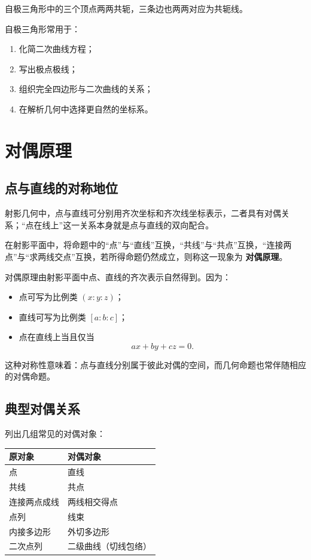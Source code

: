 \begin{property}
自极三角形中的三个顶点两两共轭，三条边也两两对应为共轭线。
\end{property}

自极三角形常用于：

\begin{enumerate}
    \item 化简二次曲线方程；
    \item 写出极点极线；
    \item 组织完全四边形与二次曲线的关系；
    \item 在解析几何中选择更自然的坐标系。
\end{enumerate}

\chapter{对偶原理}

\section{点与直线的对称地位}
射影几何中，点与直线可分别用齐次坐标和齐次线坐标表示，二者具有对偶关系；“点在线上”这一关系本身就是点与直线的双向配合。

\begin{definition}
在射影平面中，将命题中的“点”与“直线”互换，“共线”与“共点”互换，“连接两点”与“求两线交点”互换，若所得命题仍然成立，则称这一现象为 \textbf{对偶原理}。
\end{definition}

对偶原理由射影平面中点、直线的齐次表示自然得到。因为：

\begin{itemize}
    \item 点可写为比例类 $(x:y:z)$；
    \item 直线可写为比例类 $[a:b:c]$；
    \item 点在直线上当且仅当
    \[
    ax+by+cz=0.
    \]
\end{itemize}

这种对称性意味着：点与直线分别属于彼此对偶的空间，而几何命题也常伴随相应的对偶命题。

\section{典型对偶关系}
列出几组常见的对偶对象：

\begin{center}
\begin{tabular}{>{\centering\arraybackslash}m{4cm}>{\centering\arraybackslash}m{4cm}}
\hline
原对象 & 对偶对象 \\
\hline
点 & 直线 \\
共线 & 共点 \\
连接两点成线 & 两线相交得点 \\
点列 & 线束 \\
内接多边形 & 外切多边形 \\
二次点列 & 二级曲线（切线包络） \\
\hline
\end{tabular}
\end{center}


